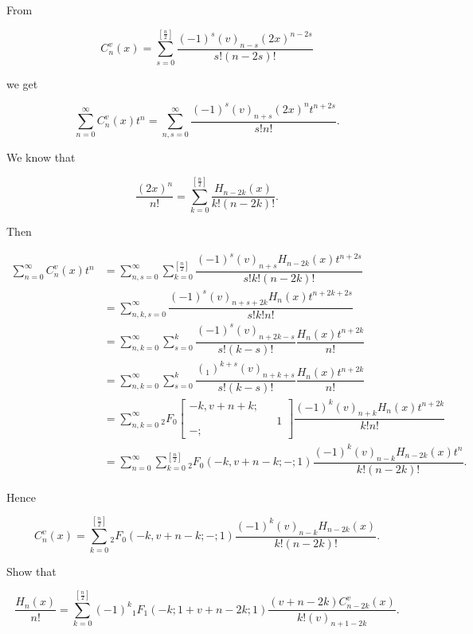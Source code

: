 \begin{solution}
From

$$C_n^v(x) = \displaystyle\sum_{s=0}^{[\frac{n}{2}]} \dfrac{(-1)^s (v)_{n-s} (2x)^{n-2s}}{s! (n-2s)!}$$

we get

$$\displaystyle\sum_{n=0}^{\infty} C_n^v(x) t^n = \displaystyle\sum_{n,s=0}^{\infty} \dfrac{(-1)^s (v)_{n+s} (2x)^n t^{n+2s}}{s! n!}.$$

We know that

$$\dfrac{(2x)^n}{n!} = \displaystyle\sum_{k=0}^{[\frac{n}{2}]} \dfrac{H_{n-2k}(x)}{k!(n-2k)!}.$$

Then

$$\begin{array}{ll}
\displaystyle\sum_{n=0}^{\infty} C_n^v(x) t^n &= \displaystyle\sum_{n,s=0}^{\infty} \displaystyle\sum_{k=0}^{[\frac{n}{2}]} \dfrac{(-1)^s (v)_{n+s} H_{n-2k}(x) t^{n+2s}}{s! k! (n-2k)!} \\
&= \displaystyle\sum_{n,k,s=0}^{\infty} \dfrac{(-1)^s (v)_{n+s+2k} H_n(x) t^{n+2k+2s}}{s!k!n!} \\
&= \displaystyle\sum_{n,k=0}^{\infty} \displaystyle\sum_{s=0}^k \dfrac{(-1)^s (v)_{n+2k-s}}{s! (k-s)!} \dfrac{H_n(x) t^{n+2k}}{n!} \\
&= \displaystyle\sum_{n,k=0}^{\infty} \displaystyle\sum_{s=0}^k \dfrac{(_1)^{k+s} (v)_{n+k+s}}{s! (k-s)!} \dfrac{H_n(x) t^{n+2k}}{n!} \\
&= \displaystyle\sum_{n,k=0}^{\infty} {}_2F_0 \left[ \begin{array}{rlr}
-k, v+n+k; & & \\
& & 1 \\
-; & &
\end{array} \right] \dfrac{(-1)^k (v)_{n+k} H_n(x) t^{n+2k}}{k! n!} \\
&= \displaystyle\sum_{n=0}^{\infty} \displaystyle\sum_{k=0}^{[\frac{n}{2}]} {}_2F_0(-k,v+n-k;-;1) \dfrac{(-1)^k (v)_{n-k} H_{n-2k}(x) t^n}{k! (n-2k)!}.
\end{array}$$

Hence

$$C_n^v(x) = \displaystyle\sum_{k=0}^{[\frac{n}{2}]} {}_2F_0(-k,v+n-k;-;1) \dfrac{(-1)^k (v)_{n-k} H_{n-2k}(x)}{k! (n-2k)!}.$$
\end{solution}
\begin{problem}\label{problem2chapter17}
Show that

$$\dfrac{H_n(x)}{n!} = \displaystyle\sum_{k=0}^{[\frac{n}{2}]} (-1)^k {}_1F_1(-k; 1+v+n-2k;1) \dfrac{(v+n-2k)C_{n-2k}^v(x)}{k! (v)_{n+1-2k}}.$$
\end{problem}
